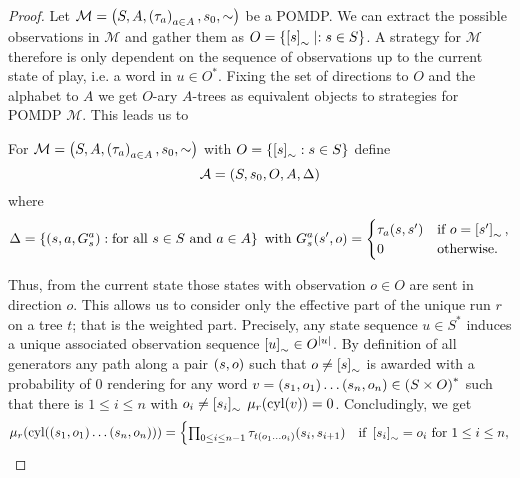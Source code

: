 \begin{proof}
  Let $\mathcal{M} = \left(S, A, \left(\tau_{a}\right)_{a\in A}, s_{0}, \sim\right)$ be a
  \ac{POMDP}. We can extract the possible observations in $\mathcal{M}$ and
  gather them as $O = \left\{\left[s\right]_{\sim}\mid:s\in S\right\}$. A strategy for
  $\mathcal{M}$ therefore is only dependent on the sequence of observations up
  to the current state of play, i.e. a word in $u\in O^{*}$. Fixing the
  set of directions to $O$ and the alphabet to $A$ we get $O$-ary $A$-trees as
  equivalent objects to strategies for \ac{POMDP} $\mathcal{M}$. This leads us 
  to 
  \begin{definition}
    For $\mathcal{M} = \left(S, A, \left(\tau_{a}\right)_{a\in A}, s_{0}, \sim\right)$
    with $O = \left\{\left[s\right]_{\sim}: s\in S\right\}$ define
    \begin{equation*}
      \mathcal{A} = \left(S, s_{0}, O, A, \Delta\right)
    \end{equation*}
    where
    \begin{equation*}
      \Delta = \left\{
        \left(s, a, G_{s}^{a}\right):\text{for all }s\in S\text{ and }a\in A
      \right\}\text{ with }
      G_{s}^{a}(s', o) = \begin{cases}
        \tau_{a}(s, s')&\text{if }o = \left[s'\right]_{\sim},\\
        0              &\text{otherwise.}
      \end{cases}
    \end{equation*}
  \end{definition}
  Thus, from the current state those states with observation $o\in O$ are sent
  in direction $o$. This allows us to consider only the effective part of the 
  unique run $r$ on a tree $t$; that is the weighted part. Precisely, any state 
  sequence $u\in S^{*}$ induces a unique associated observation sequence 
  $\left[u\right]_{\sim}\in O^{\left\vert{u}\right\vert}$. By definition of all generators any
  path along a pair $\left(s, o\right)$ such that $o\neq\left[s\right]_{\sim}$ is 
  awarded with a probability of $0$ rendering for any word 
  $v = \left(s_{1}, o_{1}\right)\dots\left(s_{n}, o_{n}\right)\in\left(S\times O\right)^{*}$ 
  such that there is $1\leq i\leq n$ with $o_{i}\neq\left[s_{i}\right]_{\sim}$
  $\mu_{r}(\operatorname{cyl}(v)) = 0$. Concludingly, we get
  \begin{equation}
    \mu_{r}(\operatorname{cyl}(\left(s_{1},o_{1}\right)\dots\left(s_{n},o_{n}\right))) =
    \begin{cases}
      \prod_{0\leq i\leq n-1}\tau_{t(o_{1}\dots o_{i})}(s_{i}, s_{i+1})
        &\text{if }\left[s_{i}\right]_{\sim} = o_{i}\text{ for }1\leq i\leq n,\\

\end{cases}
\end{equation}
\end{proof}
